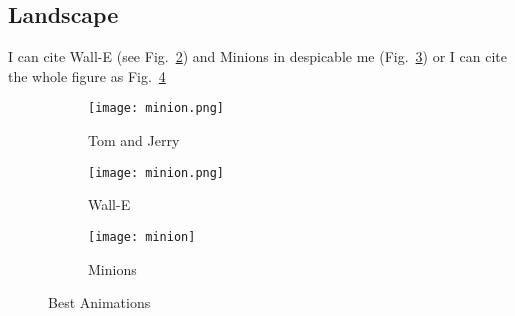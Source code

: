 
\begin{landscape}

\section{Landscape}
I can cite Wall-E (see Fig.~\ref{fig:WallE}) and Minions in despicable me (Fig.~\ref{fig:Minnion}) or I can cite the whole figure as Fig.~\ref{fig:animations}


\begin{figure}
  \centering
  \begin{subfigure}[b]{0.3\textwidth}
    \texttt{[image: minion.png]}
    \caption{Tom and Jerry}
    \label{fig:TomJerry}   
  \end{subfigure}             
  \begin{subfigure}[b]{0.3\textwidth}
    \texttt{[image: minion.png]}
    \caption{Wall-E}
    \label{fig:WallE}
  \end{subfigure}             
  \begin{subfigure}[b]{0.3\textwidth}
    \texttt{[image: minion]}
    \caption{Minions}
    \label{fig:Minnion}
  \end{subfigure}
  \caption{Best Animations}
  \label{fig:animations}
\end{figure}

\end{landscape}
